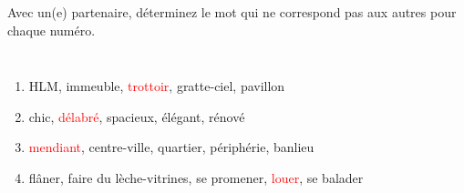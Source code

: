 \begin{frame}{}
  Avec un(e) partenaire, déterminez le mot qui ne correspond pas aux autres pour chaque numéro.
  \begin{columns}
      \begin{enumerate}
        \item HLM, immeuble, \textcolor<2->{red}{trottoir}, gratte-ciel, pavillon
        \item chic, \textcolor<4->{red}{délabré}, spacieux, élégant, rénové
        \item \textcolor<6->{red}{mendiant}, centre-ville, quartier, périphérie, banlieu
        \item flâner, faire du lèche-vitrines, se promener, \textcolor<8->{red}{louer}, se balader
      \end{enumerate}
      \begin{minipage}[c][0.75\textheight]{\linewidth}
        \begin{center}
        \end{center}
      \end{minipage}
  \end{columns}
\end{frame}